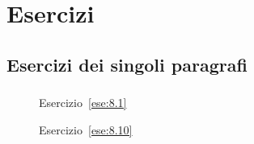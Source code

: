 
\section{Esercizi}

\subsection{Esercizi dei singoli paragrafi}


\subsubsection*{}

\begin{inaccessibleblock}
 \begin{figure}[b]
\begin{minipage}[t]{.45\textwidth}
 \centering
 \caption{Esercizio~\ref{ese:8.1}}\label{fig:8.1}
\end{minipage}
 \begin{minipage}[t]{.45\textwidth}
 \centering 
 \caption{Esercizio~\ref{ese:8.10}}\label{fig:8.2}
\end{minipage}
\end{figure}
\end{inaccessibleblock}

